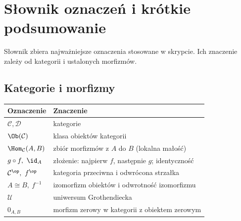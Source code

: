 \section{Słownik oznaczeń i krótkie podsumowanie}\label{sec:slownik}

Słownik zbiera najważniejsze oznaczenia stosowane w skrypcie. Ich znaczenie zależy od kategorii i ustalonych morfizmów.

\subsection{Kategorie i morfizmy}
\begin{center}
\renewcommand{\arraystretch}{1.15}
\begin{tabular}{@{}p{.34\linewidth}p{.60\linewidth}@{}}
\textbf{Oznaczenie} & \textbf{Znaczenie} \\
\hline
$\mathcal C,\mathcal D$ & kategorie \\
$\Ob(\mathcal C)$ & klasa obiektów kategorii \\
$\Hom_{\mathcal C}(A,B)$ & zbiór morfizmów z $A$ do $B$ (lokalna małość) \\
$g\circ f,\ \id_A$ & złożenie: najpierw $f$, następnie $g$; identyczność \\
$\mathcal C^{\op},\ f^{\op}$ & kategoria przeciwna i odwrócona strzałka \\
$A\cong B,\ f^{-1}$ & izomorfizm obiektów i odwrotność izomorfizmu \\
$\mathcal U$ & uniwersum Grothendiecka \\
$0_{A,B}$ & morfizm zerowy w kategorii z obiektem zerowym \\
\end{tabular}
\end{center}

